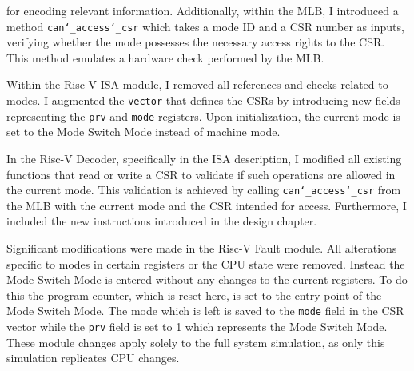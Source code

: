 for encoding relevant information. Additionally, within the MLB, I introduced a
method \texttt{can\char`_access\char`_csr} which takes a mode ID and a CSR number as inputs,
verifying whether the mode possesses the necessary access rights to the CSR.
This method emulates a hardware check performed by the MLB.\par
Within the Risc-V ISA module, I removed all references and checks related to
modes. I augmented the \texttt{vector} that defines the CSRs
by introducing new fields representing the \texttt{prv} and
\texttt{mode} registers. Upon initialization, the current mode is set to the
Mode Switch Mode instead of machine mode.\par
In the Risc-V Decoder, specifically in the ISA description, I modified all existing
functions that read or write a CSR to validate if such operations are
allowed in the current mode. This validation is achieved by calling
\texttt{can\char`_access\char`_csr} from the MLB with the current mode and the
CSR intended for access. Furthermore, I included the new instructions introduced
in the design chapter.\par
Significant modifications were made in the Risc-V Fault module. All alterations
specific to modes in certain registers or the CPU state were removed. Instead
the Mode Switch Mode is entered without any changes to the current registers. To
do this the program counter, which is reset here, is set to the entry point of
the Mode Switch Mode. The mode which is left is saved to the \texttt{mode} field
in the CSR vector while the \texttt{prv} field is set to 1 which represents the
Mode Switch Mode. These module changes apply solely to the full system
simulation, as only this simulation replicates CPU changes.\par 

